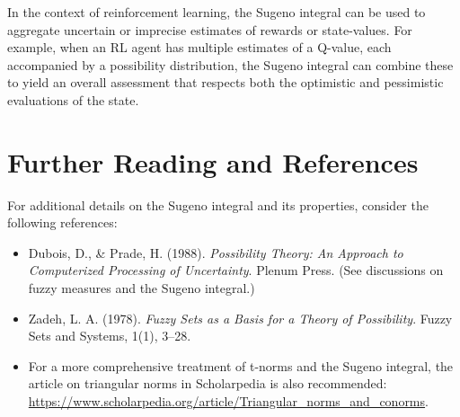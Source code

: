\documentclass[12pt]{article}
\begin{document}
In the context of reinforcement learning, the Sugeno integral can be used to aggregate uncertain or imprecise estimates of rewards or state-values. For example, when an RL agent has multiple estimates of a Q-value, each accompanied by a possibility distribution, the Sugeno integral can combine these to yield an overall assessment that respects both the optimistic and pessimistic evaluations of the state.

\section{Further Reading and References}

For additional details on the Sugeno integral and its properties, consider the following references:
\begin{itemize}[leftmargin=*]
  \item Dubois, D., \& Prade, H. (1988). \emph{Possibility Theory: An Approach to Computerized Processing of Uncertainty}. Plenum Press. (See discussions on fuzzy measures and the Sugeno integral.)
  \item Zadeh, L. A. (1978). \emph{Fuzzy Sets as a Basis for a Theory of Possibility}. Fuzzy Sets and Systems, 1(1), 3--28.
  \item For a more comprehensive treatment of t-norms and the Sugeno integral, the article on triangular norms in Scholarpedia is also recommended: \url{https://www.scholarpedia.org/article/Triangular_norms_and_conorms}.
\end{itemize}
\end{document}
